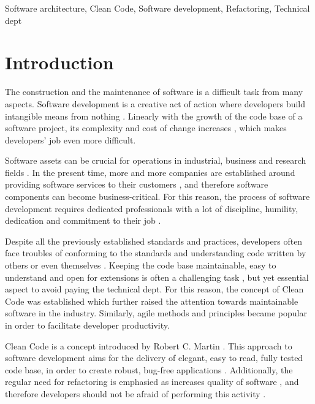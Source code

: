 \documentclass[conference]{IEEEtran}
\begin{document}
\begin{IEEEkeywords}
Software architecture, Clean Code, Software development, Refactoring, Technical dept
\end{IEEEkeywords}

\section{Introduction}
The construction and the maintenance of software is a difficult task from many aspects. Software development is a creative act of action where developers build intangible means from nothing \cite{cleancoder}. Linearly with the growth of the code base of a software project, its complexity and cost of change increases \cite{codecomplete} \cite{cleancode}, which makes developers' job even more difficult. 

Software assets can be crucial for operations in industrial, business and research fields \cite{cleancode} \cite{cleancoder}. In the present time, more and more companies are established around providing software services to their customers \cite{cusumano2008changing}, and therefore software components can become business-critical. For this reason, the process of software development requires dedicated professionals with a lot of discipline, humility, dedication and commitment to their job \cite{cleancode}. 

Despite all the previously established standards and practices, developers often face troubles of conforming to the standards and understanding code written by others or even themselves \cite{cleancoder}. Keeping the code base maintainable, easy to understand and open for extensions is often a challenging task \cite{cleancoder}, but yet essential aspect to avoid paying the technical dept. For this reason, the concept of Clean Code \cite{cleancode} was established which further raised the attention towards maintainable software in the industry. Similarly, agile methods and principles became popular in order to facilitate developer productivity. 

Clean Code is a concept introduced by Robert C. Martin \cite{cleancode} \cite{cleancoder}. This approach to software development aims for the delivery of elegant, easy to read, fully tested code base, in order to create robust, bug-free applications \cite{cleancode}. Additionally, the regular need for refactoring is emphasied as increases quality of software \cite{impactofrefactoring}, and therefore developers should not be afraid of performing this activity \cite{cleancoder}. 
\end{document}
